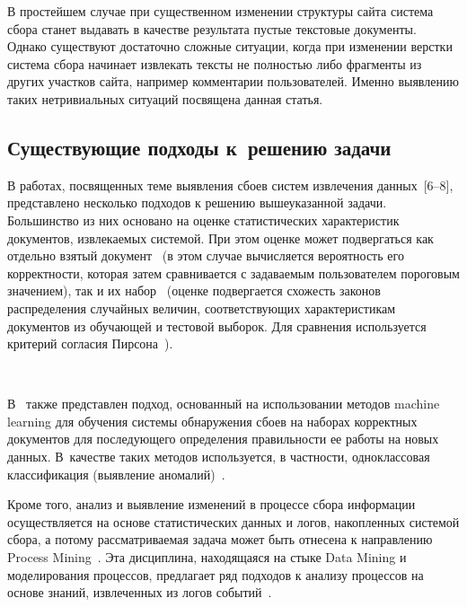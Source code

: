 \begin{multicols}{2}
    В простейшем случае при существенном изменении структуры сайта 
система сбора станет выдавать в качестве результата пустые текстовые 
документы. Однако существуют достаточно сложные ситуации, когда при 
изменении верстки система сбора начинает извлекать тексты не полностью 
либо фрагменты из других участков сайта, например комментарии 
пользователей. Именно выявлению таких нетривиальных ситуаций посвящена 
данная статья.

\subsection{Существующие подходы к~решению задачи}
  
    В работах, посвященных теме выявления сбоев систем извлечения 
данных~[6--8], представлено несколько подходов к решению вышеуказанной 
задачи. Большинство из них основано на оценке статистических характеристик 
документов, извлекаемых системой. При этом оценке может подвергаться как 
отдельно взятый документ~\cite{6-and} (в этом случае вычисляется вероятность 
его корректности, которая затем сравнивается с задаваемым пользователем 
пороговым значением), так и их набор~\cite{8-and} (оценке подвергается 
схожесть законов распределения случайных величин, соответствующих 
характеристикам документов из обучающей и тестовой выборок. Для сравнения 
используется критерий согласия Пирсона~\cite{9-and}).

\begin{figure*}[b] %
\vspace*{9pt}
 \begin{center}
 \mbox{%
 \epsfxsize=112.962mm
 }
 \end{center}
 \vspace*{-6pt}
\end{figure*}
  
  В~\cite{8-and} также представлен подход, основанный на использовании 
методов machine learning для обучения системы обнаружения сбоев на наборах 
корректных документов для последующего определения правильности ее 
работы на новых данных. В~качест\-ве таких методов используется, в частности, 
одноклассовая классификация (выявление аномалий)~\cite{10-and}.
  
  Кроме того, анализ и выявление изменений в процессе сбора информации 
осуществляется на основе статистических данных и логов, накопленных 
системой сбора, а потому рассматриваемая задача может быть отнесена к 
направлению Process Mining~\cite{11-and}. Эта дисциплина, находящаяся на 
стыке Data Mining и моделирования процессов, предлагает ряд подходов к 
анализу процессов на основе знаний, извлеченных из логов 
  событий~\cite{12-and}.


\end{multicols}
